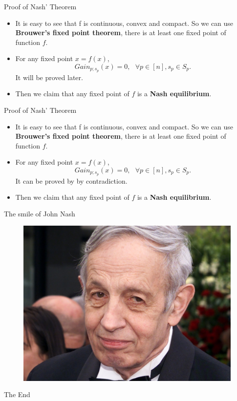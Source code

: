 \documentclass{beamer}
\begin{document}
\begin{frame}[fragile]{Proof of Nash' Theorem}
	\begin{itemize}[<+->]
		\item It is easy to see that f is continuous, convex and compact. So we can use \textbf{Brouwer's fixed point theorem}, there is at least one fixed point of function $f$.
		\item For any fixed point $x=f(x)$,
		\begin{equation}
		Gain_{p;s_p}(x) = 0, \ \ \  \forall p\in [n], s_p \in S_p .\nonumber
		\end{equation}
	It will be proved later.
	\item Then we claim that any fixed point of $f$ is a \textbf{Nash equilibrium}.
	\end{itemize}
\end{frame}

\begin{frame}[fragile]{Proof of Nash' Theorem}
	\begin{itemize}[<+->]
		\item It is easy to see that f is continuous, convex and compact. So we can use \textbf{Brouwer's fixed point theorem}, there is at least one fixed point of function $f$.
		\item For any fixed point $x=f(x)$,
		\begin{equation}
		Gain_{p;s_p}(x) = 0, \ \ \  \forall p\in [n], s_p \in S_p .\nonumber
		\end{equation}
		It can be proved by by contradiction.
		\item Then we claim that any fixed point of $f$ is a \textbf{Nash equilibrium}.
	\end{itemize}
\end{frame}

\begin{frame}[fragile]{The smile of John Nash}
	\begin{figure}[H]
		\centering
		\includegraphics[width=0.7\linewidth]{002.jpeg}\vspace{-10pt}
		\nonumber\vspace{-10pt}
	\end{figure}
\end{frame}


\begin{frame}
\Huge{\centerline{The End}}
\end{frame}
\end{document}
